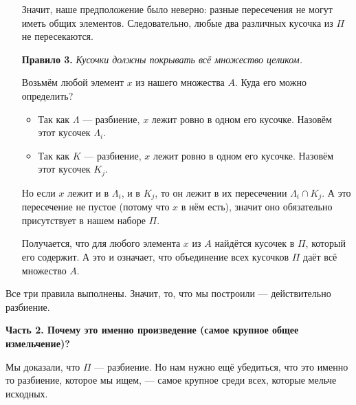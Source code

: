 \documentclass[a4paper,12pt]{article}
\begin{document}
\begin{enumerate}
	Значит, наше предположение было неверно: разные пересечения не могут иметь общих элементов. Следовательно, любые два различных кусочка из $\Pi$ не пересекаются.
	
	\item[\textbf{Правило 3.}] \textit{Кусочки должны покрывать всё множество целиком.}
	
	Возьмём любой элемент $x$ из нашего множества $A$. Куда его можно определить?
	\begin{itemize}
		\item Так как $\Lambda$ — разбиение, $x$ лежит ровно в одном его кусочке. Назовём этот кусочек $\Lambda_i$.
		\item Так как $K$ — разбиение, $x$ лежит ровно в одном его кусочке. Назовём этот кусочек $K_j$.
	\end{itemize}
	
	Но если $x$ лежит и в $\Lambda_i$, и в $K_j$, то он лежит в их пересечении $\Lambda_i \cap K_j$. А это пересечение не пустое (потому что $x$ в нём есть), значит оно обязательно присутствует в нашем наборе $\Pi$.
	
	Получается, что для любого элемента $x$ из $A$ найдётся кусочек в $\Pi$, который его содержит. А это и означает, что объединение всех кусочков $\Pi$ даёт всё множество $A$.
\end{enumerate}

Все три правила выполнены. Значит, то, что мы построили — действительно разбиение.

\vspace{0.4cm}
\noindent \textbf{Часть 2. Почему это именно произведение (самое крупное общее измельчение)?}

Мы доказали, что $\Pi$ — разбиение. Но нам нужно ещё убедиться, что это именно то разбиение, которое мы ищем, — самое крупное среди всех, которые мельче исходных.
\end{document}
